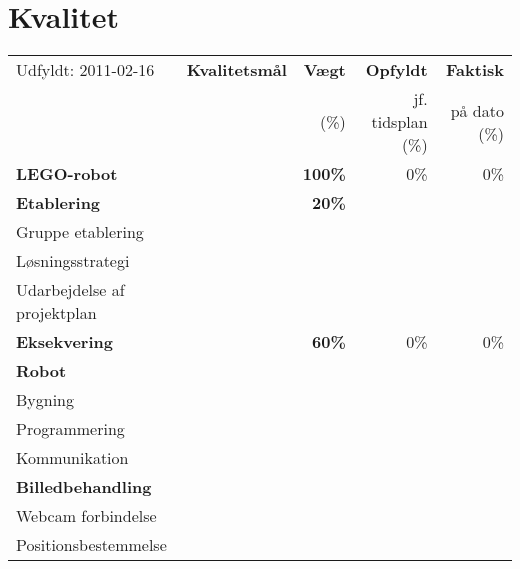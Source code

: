 \section{Kvalitet}
\begin{footnotesize}
\begin{center}
\begin{tabular}{l | l | r r r}
	\footnotesize{Udfyldt: 2011-02-16}	& \textbf{Kvalitetsmål} & \textbf{Vægt} & \textbf{Opfyldt} & \textbf{Faktisk}\\
	& & \footnotesize{(\%)}	& \footnotesize{jf. tidsplan (\%)}	& \footnotesize{på dato (\%)} \\
	\hline
	\textbf{LEGO-robot}											&		& \textbf{100\%} & 0\% & 0\% \\
	\hline
	\hline
	\textbf{Etablering}											&		& \textbf{20\%} 	& 		& \\
	\hspace*{0.3cm} Gruppe etablering 							&		&		&		& \\
	\hspace*{0.3cm} Løsningsstrategi 							&		&		&		& \\
	\hspace*{0.3cm} Udarbejdelse af projektplan 				&		&		&		& \\
	\hline
	\textbf{Eksekvering}										&		& \textbf{60\%} & 0\% & 0\% \\
	\hspace*{0.3cm} \textbf{Robot}								& 		&		& 		& \\
	\hspace*{0.3cm}\hspace*{0.3cm} Bygning						& 		&		& 		& \\
	\hspace*{0.3cm}\hspace*{0.3cm} Programmering				&		&		& 		& \\
	\hspace*{0.3cm}\hspace*{0.3cm} Kommunikation				&		&		& 		& \\
	\hspace*{0.3cm} \textbf{Billedbehandling}					&		&		& 		& \\
	\hspace*{0.3cm}\hspace*{0.3cm} Webcam forbindelse			&		&		& 		& \\
	\hspace*{0.3cm}\hspace*{0.3cm} Positionsbestemmelse			&		&		& 		& \\

\end{tabular}
\end{center}
\end{footnotesize}
